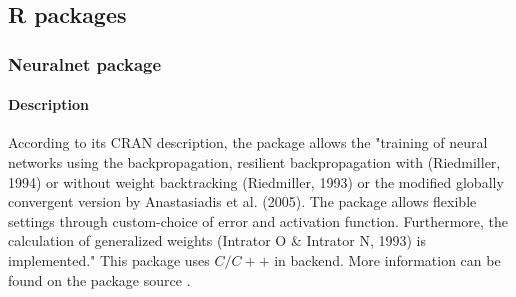 \documentclass[letter,8pt]{article}\usepackage[]{graphicx}\usepackage[]{color}
\begin{document}
\subsection{R packages}


\subsubsection{\textbf{Neuralnet package}}
\paragraph{Description}
According to its CRAN description, the package allows the "training of neural networks using the backpropagation, resilient backpropagation with (Riedmiller, 1994) or without weight backtracking (Riedmiller, 1993) or the modified globally convergent version by Anastasiadis et al. (2005). The package allows flexible settings through custom-choice of error and activation function. Furthermore, the calculation of generalized weights (Intrator O \& Intrator N, 1993) is implemented." This package uses $C/C++$ in backend. More information can be found on the package source \cite{neuralnet2019}.
\end{document}
